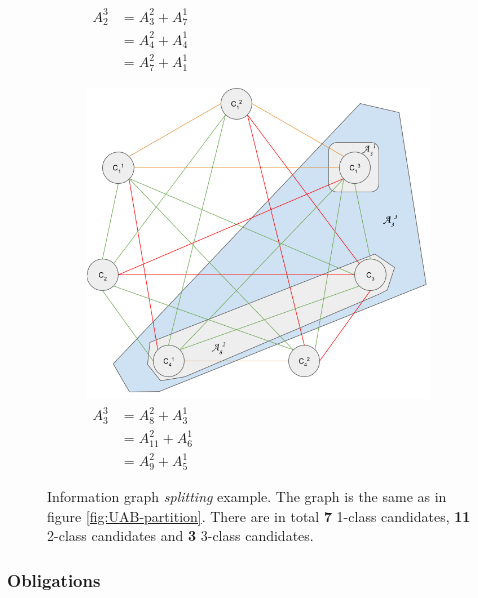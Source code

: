 \begin{figure}
\begin{subfigure}[b]{\sfwidth}
    \caption[caption]{$\begin{aligned}
              A_2^3 &= A_3^2 + A_7^1\\
                    &= A_4^2 + A_4^1\\
                    &= A_7^2 + A_1^1
              \end{aligned}$}
  \end{subfigure}
  \begin{subfigure}[b]{\sfwidth}
    \includegraphics[width=\textwidth]{img/split-3-class_3.png}
    \caption[caption]{$\begin{aligned}
              A_3^3 &= A_8^2    + A_3^1\\
                    &= A_{11}^2 + A_6^1\\
                    &= A_9^2    + A_5^1
              \end{aligned}$}
  \end{subfigure}

  \caption{Information graph \emph{splitting} example. The graph is the same
           as in figure \ref{fig:UAB-partition}.
           There are in total \textbf{7}  1-class candidates,
                                    \textbf{11} 2-class candidates and
                                    \textbf{3}  3-class candidates.}
\end{figure}

\subsubsection{Obligations}

